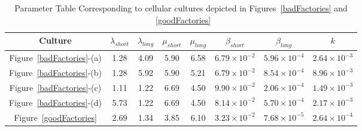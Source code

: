 \begin{table}[t]
    \renewcommand{\arraystretch}{1.3}
    \caption{Parameter Table Corresponding to cellular cultures depicted in
    Figures~\ref{badFactories} and ~\ref{goodFactories}}
    \label{figure-param-table}
    \centering
    \begin{tabular}{c||c||c||c||c||c||c||c}
        \hline
        \bfseries Culture             & \bfseries $\lambda_{short}$ & \bfseries
        $\lambda_{long}$ & \bfseries $\mu_{short}$
        & \bfseries $\mu_{long}$
        & \bfseries $\beta_{short} $
        & \bfseries $\beta_{long}$
        & \bfseries $k$
        \\
        \hline\hline
        Figure~\ref{badFactories}-(a) & 1.28                       & 4.09
        & 5.90                   & 6.58                  & $6.79 \times 10^{-2}$
        & $5.96 \times 10^{-4}$
        & $2.64 \times 10^{-3}$
        \\
        Figure~\ref{badFactories}-(b) & 1.28                       & 5.92
        & 5.90                  & 5.21                  & $6.79 \times 10^{-2}$      & $8.54 \times 10^{-4}$
        & $8.96 \times 10^{-3}$
        \\
        Figure~\ref{badFactories}-(c) & 1.11                       & 1.22                      & 6.69                   & 4.50                  & $9.90 \times 10^{-2}$     & $2.06 \times 10^{-4}$
        & $1.49 \times 10^{-3}$
        \\
        Figure~\ref{badFactories}-(d) & 5.73                       & 1.22                      & 6.69                   & 4.50                  & $8.14 \times 10^{-2}$     & $5.70 \times 10^{-4}$
        & $2.17 \times 10^{-3}$
        \\
        Figure~\ref{goodFactories}    & 2.69                       & 1.34                       & 3.85                  & 6.10                  & $3.23 \times 10^{-2}$   & $7.68 \times 10^{-5}$
        & $2.64 \times 10^{-4}$
        \\
        \hline
    \end{tabular}
\end{table}

